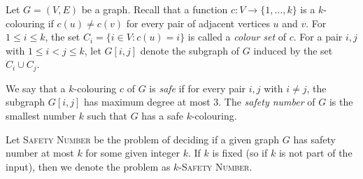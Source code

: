 \question Let $G = (V,E)$ be a graph. Recall that a function $c: V \to \{1,\ldots, k\}$ is a $k$-colouring if $c(u) \neq c(v)$ for every pair of adjacent vertices $u$ and $v$. For $1 \leq i \leq k$, the set $C_i = \{i \in V: c(u) = i\}$ is called a \emph{colour set} of $c$. For a pair $i,j$ with $1 \leq i < j \leq k$, let $G[i,j]$ denote the subgraph of $G$ induced by the set $C_i \cup C_j$. 

We say that a $k$-colouring $c$ of $G$ is \emph{safe} if for every pair $i,j$ with $i \neq j$, the subgraph $G[i,j]$ has maximum degree at most $3$. The \emph{safety number} of $G$ is the smallest number $k$ such that $G$ has a safe $k$-colouring.

Let \textsc{Safety Number} be the problem of deciding if a given graph $G$ has safety number at most $k$ for some given integer $k$. If $k$ is fixed (so if $k$ is not part of the input), then we denote the problem as \textsc{$k$-Safety Number}.

\begin{parts}
    
    
    
    
    
\end{parts}